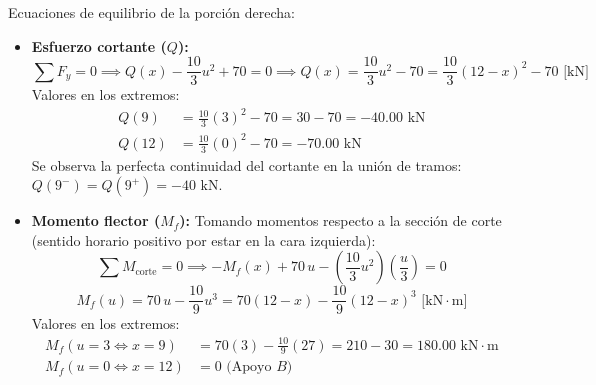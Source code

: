 Ecuaciones de equilibrio de la porción derecha:
\begin{itemize}
    \item \textbf{Esfuerzo cortante ($Q$):}
          \begin{equation}
              \sum F_y = 0 \implies Q(x) - \frac{10}{3}u^2 + 70 = 0 \implies Q(x) = \frac{10}{3}u^2 - 70 = \boxed{\frac{10}{3}(12 - x)^2 - 70\text{ [kN]}}
          \end{equation}
          Valores en los extremos:
          \begin{align*}
              Q(9)  & = \frac{10}{3}(3)^2 - 70 = 30 - 70 = -40.00\text{ kN} \\
              Q(12) & = \frac{10}{3}(0)^2 - 70 = -70.00\text{ kN}
          \end{align*}
          Se observa la perfecta continuidad del cortante en la unión de tramos: $Q(9^-) = Q(9^+) = -40\text{ kN}$.

    \item \textbf{Momento flector ($M_f$):}
          Tomando momentos respecto a la sección de corte (sentido horario positivo por estar en la cara izquierda):
          \begin{equation}
              \sum M_{\text{corte}} = 0 \implies -M_f(x) + 70\,u - \left(\frac{10}{3}u^2\right)\left(\frac{u}{3}\right) = 0
          \end{equation}
          \begin{equation}
              \boxed{M_f(u) = 70\,u - \frac{10}{9}u^3 = 70(12 - x) - \frac{10}{9}(12 - x)^3\text{ [kN}\cdot\text{m]}}
          \end{equation}
          Valores en los extremos:
          \begin{align*}
              M_f(u=3 \iff x=9)  & = 70(3) - \frac{10}{9}(27) = 210 - 30 = 180.00\text{ kN}\cdot\text{m} \\
              M_f(u=0 \iff x=12) & = 0\text{ (Apoyo } B)
          \end{align*}
\end{itemize}

